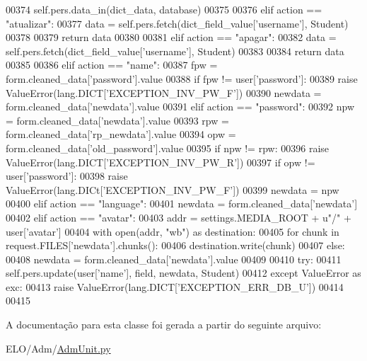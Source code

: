 \begin{DoxyCode}
00374                 self.pers.data\_in(dict\_data, database)
00375 
00376         \textcolor{keywordflow}{elif} action == \textcolor{stringliteral}{"atualizar"}:
00377             data = self.pers.fetch(dict\_field\_value[\textcolor{stringliteral}{'username'}], Student)
00378 
00379             \textcolor{keywordflow}{return} data
00380 
00381         \textcolor{keywordflow}{elif} action == \textcolor{stringliteral}{"apagar"}:
00382             data = self.pers.fetch(dict\_field\_value[\textcolor{stringliteral}{'username'}], Student)
00383 
00384             \textcolor{keywordflow}{return} data
00385 
00386         \textcolor{keywordflow}{elif} action == \textcolor{stringliteral}{"name"}:
00387             fpw = form.cleaned\_data[\textcolor{stringliteral}{'password'}].value
00388             \textcolor{keywordflow}{if} fpw != user[\textcolor{stringliteral}{'password'}]:
00389                 \textcolor{keywordflow}{raise} ValueError(lang.DICT[\textcolor{stringliteral}{'EXCEPTION\_INV\_PW\_F'}])
00390             newdata = form.cleaned\_data[\textcolor{stringliteral}{'newdata'}].value
00391         \textcolor{keywordflow}{elif} action == \textcolor{stringliteral}{"password"}:
00392             npw = form.cleaned\_data[\textcolor{stringliteral}{'newdata'}].value
00393             rpw = form.cleaned\_data[\textcolor{stringliteral}{'rp\_newdata'}].value
00394             opw = form.cleaned\_data[\textcolor{stringliteral}{'old\_password'}].value
00395             \textcolor{keywordflow}{if} npw != rpw:
00396                 \textcolor{keywordflow}{raise} ValueError(lang.DICT[\textcolor{stringliteral}{'EXCEPTION\_INV\_PW\_R'}])
00397             \textcolor{keywordflow}{if} opw != user[\textcolor{stringliteral}{'password'}]:
00398                 \textcolor{keywordflow}{raise} ValueError(lang.DICt[\textcolor{stringliteral}{'EXCEPTION\_INV\_PW\_F'}])
00399             newdata = npw
00400         \textcolor{keywordflow}{elif} action == \textcolor{stringliteral}{"language"}:
00401             newdata = form.cleaned\_data[\textcolor{stringliteral}{'newdata'}]
00402         \textcolor{keywordflow}{elif} action == \textcolor{stringliteral}{"avatar"}:
00403             addr = settings.MEDIA\_ROOT + \textcolor{stringliteral}{u"/"} + user[\textcolor{stringliteral}{'avatar'}]
00404             with open(addr, \textcolor{stringliteral}{"wb"}) \textcolor{keyword}{as} destination:
00405                     \textcolor{keywordflow}{for} chunk \textcolor{keywordflow}{in} request.FILES[\textcolor{stringliteral}{'newdata'}].chunks():
00406                         destination.write(chunk)
00407         \textcolor{keywordflow}{else}:
00408             newdata = form.cleaned\_data[\textcolor{stringliteral}{'newdata'}].value
00409 
00410         \textcolor{keywordflow}{try}:
00411             self.pers.update(user[\textcolor{stringliteral}{'name'}], field, newdata, Student)
00412         \textcolor{keywordflow}{except} ValueError \textcolor{keyword}{as} exc:
00413             \textcolor{keywordflow}{raise} ValueError(lang.DICT[\textcolor{stringliteral}{'EXCEPTION\_ERR\_DB\_U'}])
00414 
00415 
\end{DoxyCode}


A documentação para esta classe foi gerada a partir do seguinte arquivo\+:\begin{DoxyCompactItemize}
\item 
E\+L\+O/\+Adm/\hyperlink{AdmUnit_8py}{Adm\+Unit.\+py}\end{DoxyCompactItemize}

